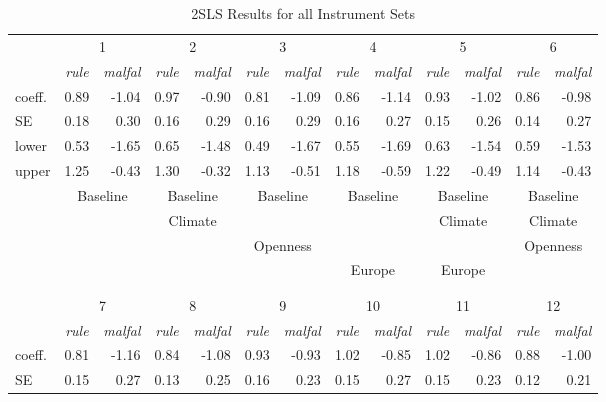 \documentclass[12pt]{article}
\theoremstyle{definition}
\begin{document}
%
\begin{table}
\caption{2SLS Results for all Instrument Sets}
\label{tab:fullresults}
 \begin{center}
 \begin{tabular}{lrrrrrrrrrrrr}\hline\hline
&\multicolumn{2}{c}{1}&
\multicolumn{2}{c}{2}&
\multicolumn{2}{c}{3}&
\multicolumn{2}{c}{4}&
\multicolumn{2}{c}{5}&
\multicolumn{2}{c}{6}\tabularnewline
&\multicolumn{1}{c}{\emph{rule}}&\multicolumn{1}{c}{\emph{malfal}}&
\multicolumn{1}{c}{\emph{rule}}&\multicolumn{1}{c}{\emph{malfal}}&
\multicolumn{1}{c}{\emph{rule}}&\multicolumn{1}{c}{\emph{malfal}}&
\multicolumn{1}{c}{\emph{rule}}&\multicolumn{1}{c}{\emph{malfal}}&
\multicolumn{1}{c}{\emph{rule}}&\multicolumn{1}{c}{\emph{malfal}}&
\multicolumn{1}{c}{\emph{rule}}&\multicolumn{1}{c}{\emph{malfal}}\tabularnewline
\hline
coeff.&0.89&-1.04&0.97&-0.90&0.81&-1.09&0.86&-1.14&0.93&-1.02&0.86&-0.98\tabularnewline
SE&0.18& 0.30&0.16& 0.29&0.16& 0.29&0.16& 0.27&0.15& 0.26&0.14& 0.27\tabularnewline
lower&0.53&-1.65&0.65&-1.48&0.49&-1.67&0.55&-1.69&0.63&-1.54&0.59&-1.53\tabularnewline
upper&1.25&-0.43&1.30&-0.32&1.13&-0.51&1.18&-0.59&1.22&-0.49&1.14&-0.43\tabularnewline
&\multicolumn{2}{c}{Baseline}&\multicolumn{2}{c}{Baseline}&\multicolumn{2}{c}{Baseline}&\multicolumn{2}{c}{Baseline}&\multicolumn{2}{c}{Baseline}&\multicolumn{2}{c}{Baseline}\tabularnewline
&&&\multicolumn{2}{c}{Climate}&&&&&\multicolumn{2}{c}{Climate}&\multicolumn{2}{c}{Climate}\tabularnewline
&&&&&\multicolumn{2}{c}{Openness}&&&&&\multicolumn{2}{c}{Openness}\tabularnewline
&&&&&&&\multicolumn{2}{c}{Europe}&\multicolumn{2}{c}{Europe}&&\tabularnewline
\hline
\\ \\
\hline\hline
&\multicolumn{2}{c}{7}&
\multicolumn{2}{c}{8}&
\multicolumn{2}{c}{9}&
\multicolumn{2}{c}{10}&
\multicolumn{2}{c}{11}&
\multicolumn{2}{c}{12}\tabularnewline
&\multicolumn{1}{c}{\emph{rule}}&\multicolumn{1}{c}{\emph{malfal}}&
\multicolumn{1}{c}{\emph{rule}}&\multicolumn{1}{c}{\emph{malfal}}&
\multicolumn{1}{c}{\emph{rule}}&\multicolumn{1}{c}{\emph{malfal}}&
\multicolumn{1}{c}{\emph{rule}}&\multicolumn{1}{c}{\emph{malfal}}&
\multicolumn{1}{c}{\emph{rule}}&\multicolumn{1}{c}{\emph{malfal}}&
\multicolumn{1}{c}{\emph{rule}}&\multicolumn{1}{c}{\emph{malfal}}\tabularnewline
\hline
coeff.&0.81&-1.16&0.84&-1.08&0.93&-0.93&1.02&-0.85&1.02&-0.86&0.88&-1.00\tabularnewline
SE&0.15& 0.27&0.13& 0.25&0.16& 0.23&0.15& 0.27&0.15& 0.23&0.12& 0.21\tabularnewline

\end{tabular}
\end{center}
\end{table}
\end{document}
